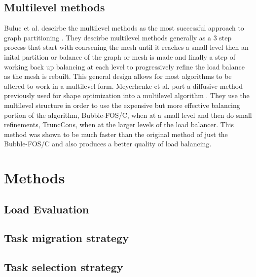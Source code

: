 \documentclass{thesis}
\begin{document}
\section{Multilevel methods}
Buluc et al. descirbe the multilevel methods as the most successful approach to 
graph partitioning \cite{surveygraph}. They descirbe multilevel methods generally 
as a 3 step process that start with coarsening the mesh until it reaches a small 
level then an inital partition or balance of the graph or mesh is made and finally
a step of working back up balancing at each level to progressively refine the 
load balance as the mesh is rebuilt. This general design allows for most 
algorithms to be altered to work in a multilevel form. Meyerhenke et al. 
port a diffusive method previously used for shape optimization into a 
multilevel algorithm \cite{multidiffuse}. They use the multilevel structure in 
order to use the expensive but more effective balancing portion of the 
algorithm, Bubble-FOS/C, when at a small level and then do small refinements, 
TruncCons, when at the larger levels of the load balancer. This method was 
shown to be much faster than the original method of just the Bubble-FOS/C and 
also produces a better quality of load balancing. 



\chapter{Methods}

\section {Load Evaluation}

\section{Task migration strategy}

\section{Task selection strategy}
\end{document}
